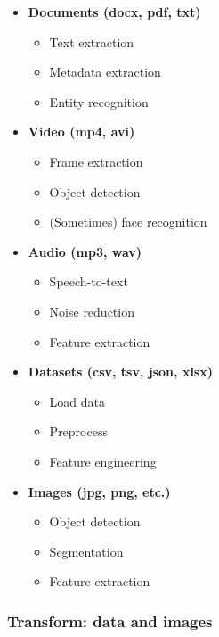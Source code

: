 \documentclass[
  letterpaper,
  DIV=11,
  numbers=noendperiod]{scrreprt}
\providecommand{\tightlist}{%
  \setlength{\itemsep}{0pt}\setlength{\parskip}{0pt}}
\begin{document}
\begin{itemize}
\tightlist
\item
  \textbf{Documents (docx, pdf, txt)}

  \begin{itemize}
  \tightlist
  \item
    Text extraction
  \item
    Metadata extraction
  \item
    Entity recognition
  \end{itemize}
\item
  \textbf{Video (mp4, avi)}

  \begin{itemize}
  \tightlist
  \item
    Frame extraction
  \item
    Object detection
  \item
    (Sometimes) face recognition
  \end{itemize}
\item
  \textbf{Audio (mp3, wav)}

  \begin{itemize}
  \tightlist
  \item
    Speech-to-text
  \item
    Noise reduction
  \item
    Feature extraction
  \end{itemize}
\item
  \textbf{Datasets (csv, tsv, json, xlsx)}

  \begin{itemize}
  \tightlist
  \item
    Load data
  \item
    Preprocess
  \item
    Feature engineering
  \end{itemize}
\item
  \textbf{Images (jpg, png, etc.)}

  \begin{itemize}
  \tightlist
  \item
    Object detection
  \item
    Segmentation
  \item
    Feature extraction
  \end{itemize}
\end{itemize}

\subsubsection{Transform: data and
images}\label{transform-data-and-images}
\end{document}
